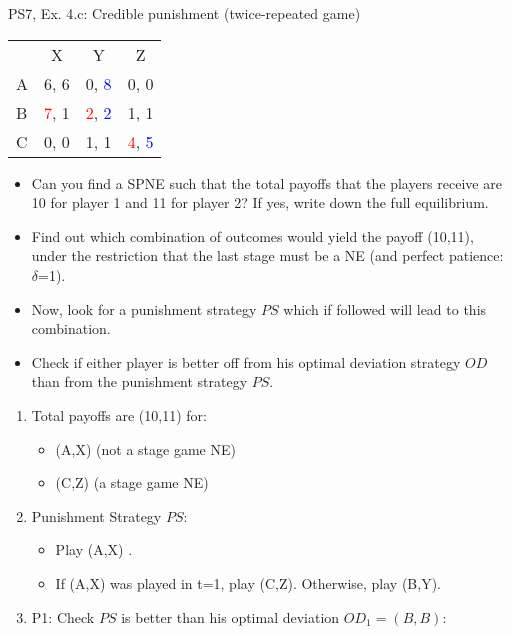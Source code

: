 \begin{frame}{PS7, Ex. 4.c: Credible punishment (twice-repeated game)}
    \vspace{-2pt}
    \begin{table}
      \begin{tabular}{l|c|c|c|}
        \multicolumn{1}{c}{} & \multicolumn{1}{c}{X} & \multicolumn{1}{c}{Y} & \multicolumn{1}{c}{Z}\\\cline{2-4}
        A   & 6, 6 &  0, \textcolor{blue}{8} &  0, 0  \\\cline{2-4}
        B & \textcolor{red}{7}, 1  & \textcolor{red}{2}, \textcolor{blue}{2} &  1, 1  \\\cline{2-4}
        C & 0, 0  & 1, 1 &  \textcolor{red}{4}, \textcolor{blue}{5}  \\\cline{2-4}
      \end{tabular}
    \end{table}
    \vspace{-4pt}
    \begin{itemize}
        \item[(c)] Can you find a SPNE such that the total payoffs that the players receive are 10 for player 1 and 11 for player 2? If yes, write down the full equilibrium.
    \end{itemize}
    \vspace{-8pt}
    \begin{multicols}{2}
      \begin{itemize}
        \item[(Step a)] Find out which combination of outcomes would yield the payoff (10,11), under the restriction that the last stage must be a NE (and perfect patience: $\delta$=1).
        \item[(Step b)] Now, look for a punishment strategy $PS$ which if followed will lead to this combination.
        \item[(Step c)] Check if either player is better off from his optimal deviation strategy $OD$ than from the punishment strategy $PS$.
      \end{itemize}
      \vfill\null\columnbreak
      \begin{enumerate}
        \item[a.] Total payoffs are (10,11) for:
        \begin{itemize}\normalsize
          \item[t=1:] (A,X) (not a stage game NE)
          \item[t=2:] (C,Z) (a stage game NE)
        \end{itemize}
        \item[b.] Punishment Strategy $PS$:
        \begin{itemize}\normalsize
          \item[t=1:] Play (A,X) .
          \item[t=2:] If (A,X) was played in t=1, play (C,Z). Otherwise, play (B,Y).
        \end{itemize}
        \item[c.] P1: Check $PS$ is better than his optimal deviation $OD_1=(B,B)$:
      \end{enumerate}
      \vfill\null
    \end{multicols}
\end{frame}
